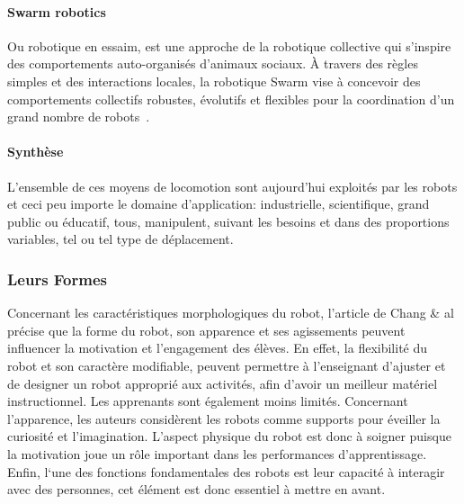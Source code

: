             \paragraph{Swarm robotics}
                Ou robotique en essaim, est une approche de la robotique collective qui s’inspire des comportements auto-organisés d’animaux sociaux. À travers des règles simples et des interactions locales, la robotique Swarm vise à concevoir des comportements collectifs robustes, évolutifs et flexibles pour la coordination d'un grand nombre de robots~.
            \paragraph{Synthèse}
                L'ensemble de ces moyens de locomotion sont aujourd'hui exploités par les robots et ceci peu importe le domaine d'application: industrielle, scientifique, grand public ou éducatif, tous, manipulent, suivant les besoins et dans des proportions variables, tel ou tel type de déplacement.
        \subsubsection{Leurs Formes}\label{sec:forme}
            Concernant les caractéristiques morphologiques du robot, l’article de Chang \& al~ précise que la forme du robot, son apparence et ses agissements peuvent influencer la motivation et l’engagement des élèves. En effet, la flexibilité du robot et son caractère modifiable, peuvent permettre à l’enseignant d’ajuster et de designer un robot approprié aux activités, afin d’avoir un meilleur matériel instructionnel. Les apprenants sont également moins limités. Concernant l’apparence, les auteurs considèrent les robots comme supports pour éveiller la curiosité et l'imagination. L’aspect physique du robot est donc à soigner puisque la motivation joue un rôle important dans les performances d'apprentissage. Enfin, l‘une des fonctions fondamentales des robots est leur capacité à interagir avec des personnes, cet élément est donc essentiel à mettre en avant.
